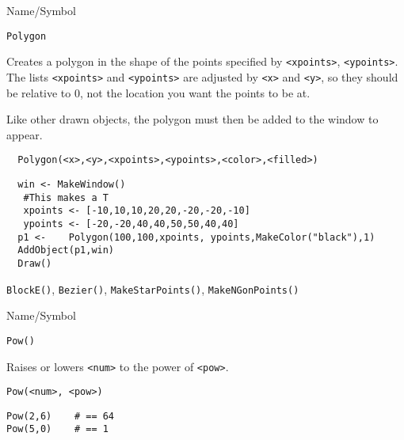 \begin{desc}{Name/Symbol}
\item[Name/Symbol]  	\verb+Polygon+ 

\item[Description] Creates a polygon in the shape of the points
specified by \verb+<xpoints>+, \verb+<ypoints>+. The lists \verb+<xpoints>+ and
\verb+<ypoints>+ are adjusted by  \verb+<x>+ and \verb+<y>+, so they
should be relative to 0, not the location you want the points to be at.

Like other drawn objects, the polygon must then be added to the window
to appear.

\item[Usage]		
\begin{verbatim}
  Polygon(<x>,<y>,<xpoints>,<ypoints>,<color>,<filled>)
\end{verbatim}

\item[Example]	
\begin{verbatim}
  win <- MakeWindow()
   #This makes a T
   xpoints <- [-10,10,10,20,20,-20,-20,-10]
   ypoints <- [-20,-20,40,40,50,50,40,40]
  p1 <-    Polygon(100,100,xpoints, ypoints,MakeColor("black"),1)
  AddObject(p1,win)
  Draw()
\end{verbatim}

\item[See Also]   
\verb+BlockE()+, \verb+Bezier()+, \verb+MakeStarPoints()+,
\verb+MakeNGonPoints()+
\end{desc}

\rl


\begin{desc}{Name/Symbol}
\item[Name/Symbol]	\verb+Pow()+ 

\item[Description]	Raises or lowers \verb+<num>+ to the power of \verb+<pow>+.

\item[Usage]		
\begin{verbatim}
Pow(<num>, <pow>)
\end{verbatim}

\item[Example]	
\begin{verbatim}
Pow(2,6)	# == 64
Pow(5,0)	# == 1
\end{verbatim}

\item[See Also]     
\end{desc}

